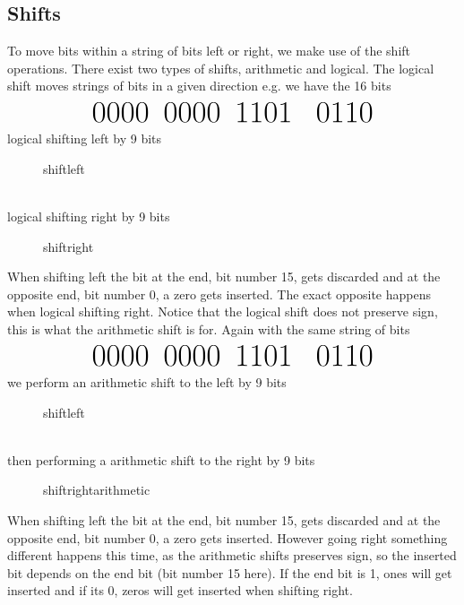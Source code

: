     \subsection{Shifts}
        To move bits within a string of bits left or right, we make use of the shift operations. There exist two types of shifts, arithmetic and logical.
        The logical shift moves strings of bits in a given direction e.g. we have the 16 bits
        \begin{equation*}
            \text{\Huge 0000\, 0000\, 1101 \, 0110}
        \end{equation*}
        logical shifting left by 9 bits
        \begin{figure*}[h!]
            \centering
            {shiftleft}
        \end{figure*}
    \\
        logical shifting right by 9 bits
        \begin{figure*}[h!]
            \centering
            {shiftright}
        \end{figure*} 

        When shifting left the bit at the end, bit number 15, gets discarded and at the opposite end, bit number 0, a zero gets inserted. The exact opposite happens when logical shifting right. Notice that the logical shift does not preserve sign, this is what the arithmetic shift is for. Again with the same string of bits
        \begin{equation*}
            \text{\Huge 0000\, 0000\, 1101 \, 0110}
        \end{equation*}
        we perform an arithmetic shift to the left by 9 bits
        \begin{figure*}[h!]
            \centering
            {shiftleft}
        \end{figure*}
    \\
        then performing a arithmetic shift to the right by 9 bits
        \begin{figure*}[h!]
            \centering
            {shiftrightarithmetic}
        \end{figure*}
        
        When shifting left the bit at the end, bit number 15, gets discarded and at the opposite end, bit number 0, a zero gets inserted. However going right something different happens this time, as the arithmetic shifts preserves sign, so the inserted bit depends on the end bit (bit number 15 here). If the end bit is 1, ones will get inserted and if its 0, zeros will get inserted when shifting right.
        

